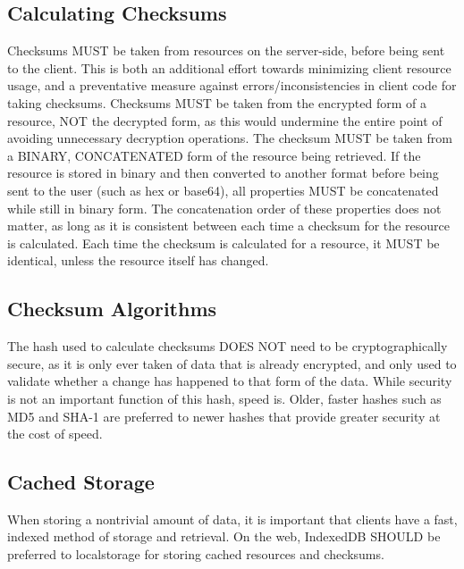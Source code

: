 \documentclass{article}
\begin{document}
\subsection{Calculating Checksums}
Checksums MUST be taken from resources on the server-side, before being sent to the client. This is both an additional effort towards minimizing client resource usage, and a preventative measure against errors/inconsistencies in client code for taking checksums. Checksums MUST be taken from the encrypted form of a resource, NOT the decrypted form, as this would undermine the entire point of avoiding unnecessary decryption operations. The checksum MUST be taken from a BINARY, CONCATENATED form of the resource being retrieved. If the resource is stored in binary and then converted to another format before being sent to the user (such as hex or base64), all properties MUST be concatenated while still in binary form. The concatenation order of these properties does not matter, as long as it is consistent between each time a checksum for the resource is calculated. Each time the checksum is calculated for a resource, it MUST be identical, unless the resource itself has changed.

\subsection{Checksum Algorithms}
The hash used to calculate checksums DOES NOT need to be cryptographically secure, as it is only ever taken of data that is already encrypted, and only used to validate whether a change has happened to that form of the data. While security is not an important function of this hash, speed is. Older, faster hashes such as MD5 and SHA-1 are preferred to newer hashes that provide greater security at the cost of speed.

\subsection{Cached Storage}
When storing a nontrivial amount of data, it is important that clients have a fast, indexed method of storage and retrieval. On the web, IndexedDB SHOULD be preferred to localstorage for storing cached resources and checksums.
\end{document}
